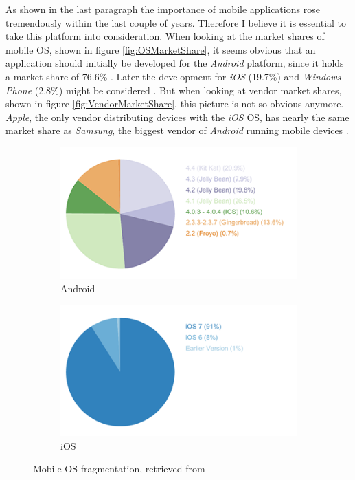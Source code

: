As shown in the last paragraph the importance of mobile applications rose tremendously within the last couple of years. Therefore I believe it is essential to take this platform into consideration. When looking at the market shares of mobile \gls{OS}, shown in figure \vref{fig:OSMarketShare}, it seems obvious that an application should initially be developed for the \emph{Android} platform, since it holds a market share of 76.6\% \cite{IDC:2015aa}. Later the development for \emph{iOS} (19.7\%) and \emph{Windows Phone} (2.8\%) might be considered \cite{IDC:2015aa}. But when looking at vendor market shares, shown in figure \vref{fig:VendorMarketShare}, this picture is not so obvious anymore. \emph{Apple}, the only vendor distributing devices with the \emph{iOS} \gls{OS}, has nearly the same market share as \emph{Samsung}, the biggest vendor of \emph{Android} running mobile devices \cite{IDC:2015ab}.

\begin{figure}[h]
	\centering
	\begin{subfigure}{.49\textwidth}
  		\centering
  		\includegraphics[width=0.98\linewidth]{./images/android-os.png}
  		\caption{Android}
  		\label{fig:AndroidOSFragmentation}
	\end{subfigure}
	\begin{subfigure}{.49\textwidth}
  		\centering
  		\includegraphics[width=0.98\linewidth]{./images/ios-os.png}
  		\caption{iOS}
  		\label{fig:iOSOSFragmentation}
	\end{subfigure}
	\caption{Mobile \gls{OS} fragmentation, retrieved from \cite{OpenSignal:2014aa}}
	\label{fig:MobileOSFragmentation}
\end{figure}
\nocite{OpenSignal:2014aa}

